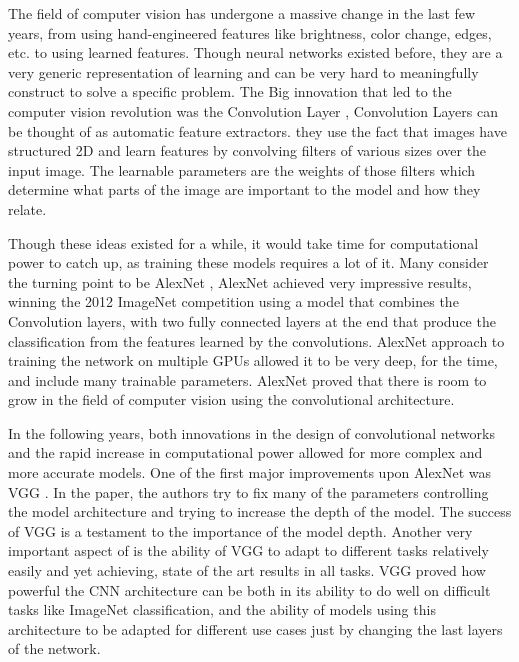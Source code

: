 \documentclass[../main.tex]{subfiles}
\begin{document}
The field of computer vision has undergone a massive change in the last few years, from using hand-engineered features like brightness, color change, edges, etc.
to using learned features. Though neural networks existed before, they are a very generic representation of learning and can be very hard to meaningfully construct to solve a specific problem.
The Big innovation that led to the computer vision revolution was the Convolution Layer \cite{originalcnn}, Convolution Layers can be thought of as automatic feature extractors.
they use the fact that images have structured 2D and learn features by convolving filters of various sizes over the input image. The learnable parameters are the weights of those
filters which determine what parts of the image are important to the model and how they relate.
\par

Though these ideas existed for a while, it would take time for computational power to catch up, as training these models requires a lot of it.
Many consider the turning point to be AlexNet \cite{alexnet}, AlexNet achieved very impressive results, winning the 2012 ImageNet competition using a model that combines the Convolution layers,
with two fully connected layers at the end that produce the classification from the features learned by the convolutions.
AlexNet approach to training the network on multiple GPUs allowed it to be very deep, for the time, and include many trainable parameters.
AlexNet proved that there is room to grow in the field of computer vision using the convolutional architecture.
\par

In the following years, both innovations in the design of convolutional networks and the rapid increase in computational power allowed for more complex and more accurate models.
One of the first major improvements upon AlexNet was VGG \cite{vgg}. In the paper, the authors try to fix many of the parameters controlling the model architecture and trying to increase the depth of the model.
The success of VGG is a testament to the importance of the model depth.
Another very important aspect of \cite{vgg} is the ability of VGG to adapt to different tasks relatively easily and yet achieving, state of the art results in all tasks.
VGG proved how powerful the CNN architecture can be both in its ability to do well on difficult tasks like ImageNet classification,
and the ability of models using this architecture to be adapted for different use cases just by changing the last layers of the network.
\par
\end{document}
